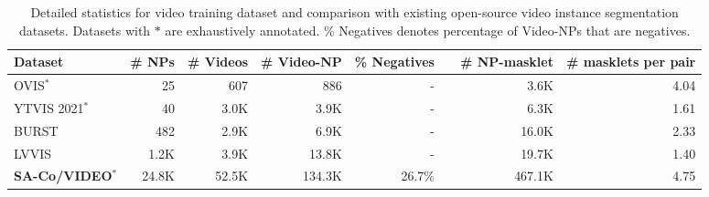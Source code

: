 \documentclass[]{fairmeta}
\newcommand{\myappendixtablesize}{8}
\newcommand{\myappendixtablebaselineskip}{9.5}
\newcommand{\dsname}{{SA-Co}\xspace}
\newcommand{\trainvid}{{\dsname/VIDEO}\xspace}
\begin{document}
\begin{table}[h]
	\centering
	{\footnotesize
		{\fontsize{\myappendixtablesize}{\myappendixtablebaselineskip}\selectfont
			\begin{NiceTabular}{lrrrrrrr}
				\CodeBefore
				\Body
				\textbf{Dataset} & \# NPs & \# Videos & \# Video-NP & \% Negatives &    & \# NP-masklet & \# masklets per pair\\
				\midrule
				OVIS$^{*}$ & 25 & 607 & 886 & - & & 3.6K & 4.04\\
				YTVIS 2021$^{*}$ & 40 & 3.0K & 3.9K & - & & 6.3K & 1.61\\
				BURST & 482 & 2.9K & 6.9K & - & & 16.0K & 2.33\\
				LVVIS & 1.2K & 3.9K & 13.8K & - & & 19.7K & 1.40\\
				\midrule
				\textbf{\trainvid}$^{*}$ & 24.8K & 52.5K & 134.3K & 26.7\% & & 467.1K & 4.75\\
			\end{NiceTabular}  
		}
	}
	\caption{Detailed statistics for video training dataset and comparison with existing open-source video instance segmentation datasets. Datasets with $*$ are exhaustively annotated. \% Negatives denotes percentage of Video-NPs that are negatives.}   
	\label{tab:sac_train_vid_data_stats}
\end{table}
\end{document}
